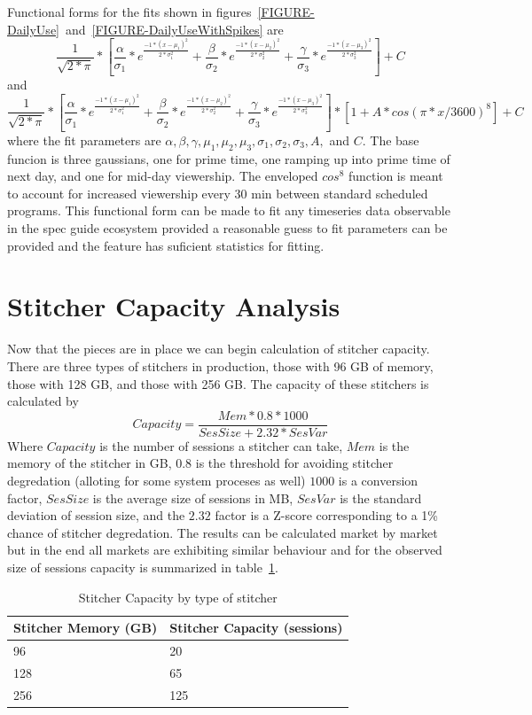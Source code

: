 \documentclass{article}
\begin{document}
Functional forms for the fits shown in figures~\ref{FIGURE-DailyUse}~and~\ref{FIGURE-DailyUseWithSpikes} are $$ \frac{1}{\sqrt{2*\pi}} * [ \frac{\alpha}{\sigma_1} * e^{\frac{-1*(x-\mu_1)^{2}}{2*\sigma_1^{2}}} + \frac{\beta}{\sigma_2} * e^{\frac{-1*(x-\mu_2)^{2}}{2*\sigma_2^{2}}} + \frac{\gamma}{\sigma_3} * e^{\frac{-1*(x-\mu_3)^{2}}{2*\sigma_3^{2}}}] + C$$ and  $$ \frac{1}{\sqrt{2*\pi}} * [ \frac{\alpha}{\sigma_1} * e^{\frac{-1*(x-\mu_1)^{2}}{2*\sigma_1^{2}}} + \frac{\beta}{\sigma_2} * e^{\frac{-1*(x-\mu_2)^{2}}{2*\sigma_2^{2}}} + \frac{\gamma}{\sigma_3} * e^{\frac{-1*(x-\mu_3)^{2}}{2*\sigma_3^{2}}}]* [1+A*cos(\pi*x/3600)^{8}] + C$$ where the fit parameters are $\alpha, \beta, \gamma, \mu_1, \mu_2, \mu_3, \sigma_1, \sigma_2, \sigma_3, A,$ and $C$. The base funcion is three gaussians, one for prime time, one ramping up into prime time of next day, and one for mid-day viewership. The enveloped $cos^{8}$ function is meant to account for increased viewership every 30 min between standard scheduled programs. This functional form can be made to fit any timeseries data observable in the spec guide ecosystem provided a reasonable guess to fit parameters can be provided and the feature has suficient statistics for fitting. 



\section{Stitcher Capacity Analysis}

Now that the pieces are in place we can begin calculation of stitcher capacity. There are three types of stitchers in production, those with 96 GB of memory, those with 128 GB, and those with 256 GB. The capacity of these stitchers is calculated by  $$Capacity=\frac{Mem * 0.8 * 1000}{SesSize + 2.32*SesVar}$$ Where $Capacity$ is the number of sessions a stitcher can take, $Mem$ is the memory of the stitcher in GB, $0.8$ is the threshold for avoiding stitcher degredation (alloting for some system proceses as well) $1000$ is a conversion factor, $SesSize$ is the average size of sessions in MB, $SesVar$ is the standard deviation of session size, and the $2.32$ factor is a Z-score corresponding to a 1\% chance of stitcher degredation. The results can be calculated market by market but in the end all markets are exhibiting similar behaviour and for the observed size of sessions capacity is summarized in table~\ref{TABLE-StitcherCapacity}.

\begin{table}
\begin{tabular}{|l|l|} 
\hline Stitcher Memory (GB) & Stitcher Capacity (sessions) \\
\hline 96 & 20 \\
\hline 128 & 65 \\
\hline 256 & 125 \\
\hline 
\end{tabular}
\caption{\label{TABLE-StitcherCapacity}Stitcher Capacity by type of stitcher}
\end{table}
\end{document}
